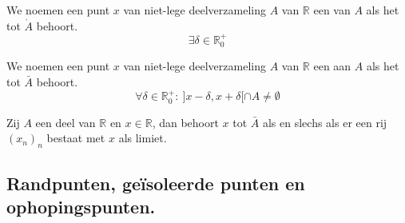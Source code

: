 \documentclass[main.tex]{subfiles}
\begin{document}
\begin{de}
  We noemen een punt $x$ van niet-lege deelverzameling $A$ van $\mathbb{R}$ een  van $A$ als het tot $\mathring{A}$ behoort.
  \[ \exists \delta \in \mathbb{R}_{0}^{+} \]
\end{de}

\begin{de}
  We noemen een punt $x$ van niet-lege deelverzameling $A$ van $\mathbb{R}$ een  aan $A$ als het tot $\bar{A}$ behoort.
  \[ \forall \delta \in \mathbb{R}_{0}^{+}:\ ]x-\delta, x+\delta[ \cap A \neq \emptyset \]
\end{de}

\begin{pr}
  Zij $A$ een deel van $\mathbb{R}$ en $x\in \mathbb{R}$, dan behoort $x$ tot $\bar{A}$ als en slechs als er een rij $(x_{n})_{n}$ bestaat met $x$ als limiet.
\end{pr}

\subsection{Randpunten, ge\"isoleerde punten en ophopingspunten.}
\label{sec:randp-geis-punt}
\end{document}
